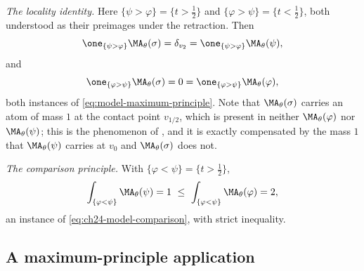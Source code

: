\begin{example}
\emph{The locality identity.}  Here $\{\psi>\varphi\}=\{t>\tfrac12\}$ and
$\{\varphi>\psi\}=\{t<\tfrac12\}$, both understood as their preimages
under the retraction.  Then
\[
 \one_{\{\psi>\varphi\}}\MA_\theta(\sigma)=\delta_{v_2}
 =\one_{\{\psi>\varphi\}}\MA_\theta(\psi),
\]
and
\[
 \one_{\{\varphi>\psi\}}\MA_\theta(\sigma)=0
 =\one_{\{\varphi>\psi\}}\MA_\theta(\varphi),
\]
both instances of \eqref{eq:model-maximum-principle}.  Note that
$\MA_\theta(\sigma)$ carries an atom of mass $1$ at the contact point
$v_{1/2}$, which is present in neither $\MA_\theta(\varphi)$ nor
$\MA_\theta(\psi)$; this is the phenomenon of
, and it is exactly compensated by the mass
$1$ that $\MA_\theta(\psi)$ carries at $v_0$ and
$\MA_\theta(\sigma)$ does not.

\emph{The comparison principle.}  With
$\{\varphi<\psi\}=\{t>\tfrac12\}$,
\[
 \int_{\{\varphi<\psi\}}\MA_\theta(\psi)=1
 \ \leq\
 \int_{\{\varphi<\psi\}}\MA_\theta(\varphi)=2 ,
\]
an instance of \eqref{eq:ch24-model-comparison}, with strict inequality.
\end{example}

\subsection{A maximum-principle application}
\label{sec:ch24-ex-maxprin}

